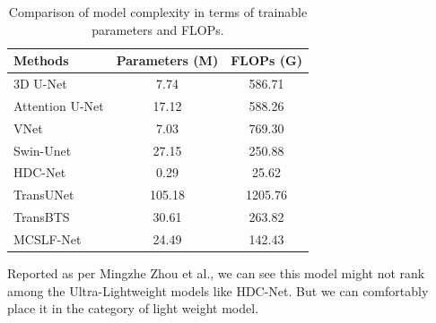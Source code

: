\begin{table}[!htbp]
    \caption{Comparison of model complexity in terms of trainable parameters and FLOPs.}
    \label{tab:complexity}
    \centering
    \begin{tabular}{lcc}
        \toprule
        Methods & Parameters (M) & FLOPs (G) \\
        \midrule
        3D U-Net        & 7.74  & 586.71 \\
        Attention U-Net & 17.12 & 588.26 \\
        VNet            & 7.03  & 769.30 \\
        Swin-Unet       & 27.15 & 250.88 \\
        HDC-Net         & 0.29  & 25.62  \\
        TransUNet       & 105.18 & 1205.76 \\
        TransBTS        & 30.61 & 263.82 \\
        MCSLF-Net       & 24.49 & 142.43 \\
        \bottomrule
    \end{tabular}
\end{table}

Reported as per Mingzhe Zhou et al., we can see this model might not rank among the Ultra-Lightweight models like HDC-Net. But we can comfortably place it in the category of light weight model.
